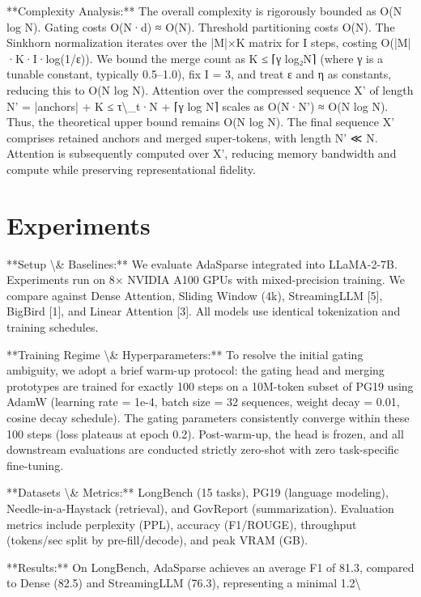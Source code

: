 \documentclass[11pt,a4paper]{article}
\begin{document}
**Complexity Analysis:** The overall complexity is rigorously bounded as O(N log N). Gating costs O(N·d) ≈ O(N). Threshold partitioning costs O(N). The Sinkhorn normalization iterates over the |M|×K matrix for I steps, costing O(|M|·K·I·log(1/ε)). We bound the merge count as K ≤ ⌈γ log₂N⌉ (where γ is a tunable constant, typically 0.5–1.0), fix I = 3, and treat ε and η as constants, reducing this to O(N log N). Attention over the compressed sequence X' of length N' = |anchors| + K ≤ τ\textbackslash{}_t·N + ⌈γ log N⌉ scales as O(N·N') ≈ O(N log N). Thus, the theoretical upper bound remains O(N log N). The final sequence X' comprises retained anchors and merged super-tokens, with length N' ≪ N. Attention is subsequently computed over X', reducing memory bandwidth and compute while preserving representational fidelity.

\section{Experiments}
**Setup \textbackslash{}& Baselines:** We evaluate AdaSparse integrated into LLaMA-2-7B. Experiments run on 8× NVIDIA A100 GPUs with mixed-precision training. We compare against Dense Attention, Sliding Window (4k), StreamingLLM [5], BigBird [1], and Linear Attention [3]. All models use identical tokenization and training schedules.

**Training Regime \textbackslash{}& Hyperparameters:** To resolve the initial gating ambiguity, we adopt a brief warm-up protocol: the gating head and merging prototypes are trained for exactly 100 steps on a 10M-token subset of PG19 using AdamW (learning rate = 1e-4, batch size = 32 sequences, weight decay = 0.01, cosine decay schedule). The gating parameters consistently converge within these 100 steps (loss plateaus at epoch 0.2). Post-warm-up, the head is frozen, and all downstream evaluations are conducted strictly zero-shot with zero task-specific fine-tuning.

**Datasets \textbackslash{}& Metrics:** LongBench (15 tasks), PG19 (language modeling), Needle-in-a-Haystack (retrieval), and GovReport (summarization). Evaluation metrics include perplexity (PPL), accuracy (F1/ROUGE), throughput (tokens/sec split by pre-fill/decode), and peak VRAM (GB).

**Results:** On LongBench, AdaSparse achieves an average F1 of 81.3, compared to Dense (82.5) and StreamingLLM (76.3), representing a minimal 1.2\textbackslash{}%
\end{document}
